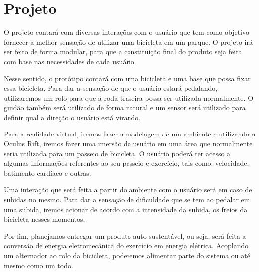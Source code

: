 \chapter[Projeto]{Projeto}
O projeto contará com diversas interações com o usuário que tem como objetivo fornecer a melhor sensação de utilizar uma bicicleta em um parque. O projeto irá ser feito de forma modular, para que a constituição final do produto seja feita com base nas necessidades de cada usuário. 

Nesse sentido, o protótipo contará com uma bicicleta e uma base que possa fixar essa bicicleta. Para dar a sensação de que o usuário estará pedalando, utilizaremos um rolo para que a roda traseira possa ser utilizada normalmente. O guidão também será utilizado de forma natural e um sensor será utilizado para definir qual a direção o usuário está virando. 

Para a realidade virtual, iremos fazer a modelagem de um ambiente e utilizando o Oculus Rift, iremos fazer uma imersão do usuário em uma área que normalmente seria utilizada para um passeio de bicicleta. O usuário poderá ter acesso a algumas informações referentes ao seu passeio e exercício, tais como: velocidade, batimento cardíaco e outras. 

Uma interação que será feita a partir do ambiente com o usuário será em caso de subidas no mesmo. Para dar a sensação de dificuldade que se tem ao pedalar em uma subida, iremos acionar de acordo com a intensidade da subida, os freios da bicicleta nesses momentos. 

Por fim, planejamos entregar um produto auto sustentável, ou seja, será feita a conversão de energia eletromecânica do exercício em energia elétrica. Acoplando um alternador ao rolo da bicicleta, poderemos alimentar parte do sistema ou até mesmo como um todo.

